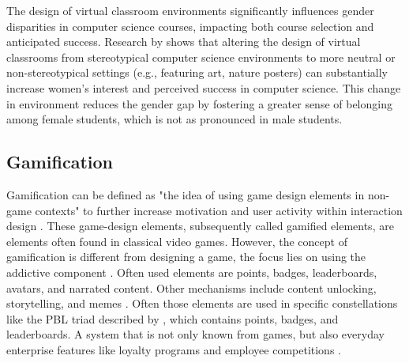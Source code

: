 The design of virtual classroom environments significantly influences gender disparities in computer science courses, impacting both course selection and anticipated success.
Research by \textcite{cheryanClassroomsMatterDesign2011} shows that altering the design of virtual classrooms from stereotypical computer science environments  to more neutral or non-stereotypical settings (e.g., featuring art, nature posters) can substantially increase women's interest and perceived success in computer science.
This change in environment reduces the gender gap by fostering a greater sense of belonging among female students, which is not as pronounced in male students.

\subsection{Gamification}
Gamification can be defined as "the idea of using game design elements in non-game contexts" \parencite{deterdingGameDesignElements2011} to further increase motivation and user activity within interaction design \parencite{deterdingGameDesignElements2011}.
These game-design elements, subsequently called gamified elements, are elements often found in classical video games. However, the concept of gamification is different from designing a game, the focus lies on using the addictive component \parencite{gonzalezGamificationIntelligentTutoring2014}. Often used elements are points, badges, leaderboards, avatars, and narrated content. Other mechanisms include content unlocking, storytelling, and memes \parencite{zainuddinImpactGamificationLearning2020}.
Often those elements are used in specific constellations like the PBL triad described by \textcite{werbachWinHowGame2012}, which contains points, badges, and leaderboards.
A system that is not only known from games, but also everyday enterprise features like loyalty programs and employee competitions \parencite{werbachWinHowGame2012}.

